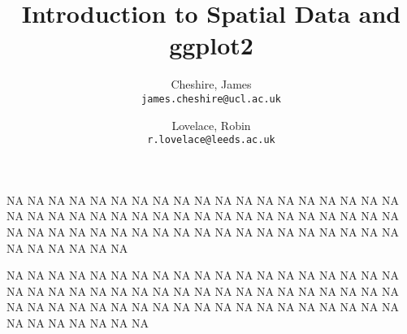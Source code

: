 NA
NA
NA
NA
NA
NA
NA
NA
NA
NA
NA
NA
NA
NA
NA
NA
NA
NA
NA
NA
NA
NA
NA
NA
NA
NA
NA
NA
NA
NA
NA
NA
NA
NA
NA
NA
NA
NA
NA
NA
NA
NA
NA
NA
NA
NA
NA
NA
NA
NA
NA
NA
NA
NA
NA
NA
NA
NA
NA
NA
NA
NA
NA
\author{
Cheshire, James\\
\texttt{james.cheshire@ucl.ac.uk}
\and
Lovelace, Robin\\
\texttt{r.lovelace@leeds.ac.uk}
}
\title{Introduction to Spatial Data and ggplot2}
NA
NA
NA
NA
NA
NA
NA
NA
NA
NA
NA
NA
NA
NA
NA
NA
NA
NA
NA
NA
NA
NA
NA
NA
NA
NA
NA
NA
NA
NA
NA
NA
NA
NA
NA
NA
NA
NA
NA
NA
NA
NA
NA
NA
NA
NA
NA
NA
NA
NA
NA
NA
NA
NA
NA
NA
NA
NA
NA
NA
NA
NA
NA
NA
